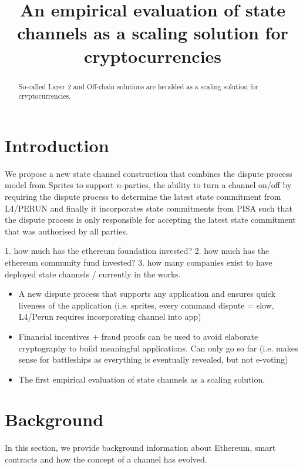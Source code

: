 \documentclass{llncs}
\begin{document}
	\title{An empirical evaluation of state channels as a scaling solution for cryptocurrencies}
	\maketitle
	\begin{abstract}
		So-called Layer 2 and Off-chain solutions are heralded as a scaling solution for cryptocurrencies. 
	\end{abstract} 

\section{Introduction}

We propose a new state channel construction that combines the dispute process model from Sprites to support $n$-parties, the ability to turn a channel on/off by requiring the dispute process to determine the latest state commitment from L4/PERUN and finally it incorporates state commitments from PISA such that the dispute process is only responsible for accepting the latest state commitment that was authorised by all parties. 


1. how much has the ethereum foundation invested?
2. how much has the ethereum community fund invested?
3. how many companies exist to have deployed state channels / currently in the works. 



\begin{itemize}
\item A new dispute process that supports any application and ensures quick liveness of the application (i.e. sprites, every command dispute = slow, L4/Perun requires incorporating channel into app)
\item Financial incentives + fraud proofs can be used to avoid elaborate cryptography to build meaningful applications. Can only go so far (i.e. makes sense for battleships as everything is eventually revealed, but not e-voting) 
\item The first empirical evaluation of state channels as a scaling solution. 

\end{itemize}
\section{Background}

In this section, we provide background information about Ethereum, smart contracts and how the concept of a channel has evolved. 
\end{document}
